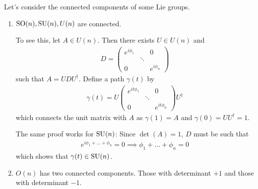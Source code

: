 Let's consider the connected components of some Lie groups.
\begin{enumerate}
  \item $\operatorname{SO}(n), \operatorname{SU}(n), U(n)$ are connected.

    To see this, let $A \in U(n)$. Then there exists $U \in U(n)$ and
    \begin{align*}
      D= \begin{pmatrix}
      e^{i \phi_1} &  & 0\\
       & \ddots & \\
      0 &  & e^{i \phi_n}
      \end{pmatrix}
    \end{align*}
    such that $A = UDU^{\dagger}$. Define a path $\gamma(t)$ by
    \begin{align*}
      \gamma(t) = U
      \begin{pmatrix}
      e^{it \phi_1} &  & 0\\
       & \ddots & \\
      0 &  & e^{i t\phi_n}
      \end{pmatrix}
      U^{\dagger}
    \end{align*}
    which connects the unit matrix with $A$ as $\gamma(1) = A$ and $\gamma(0) = UU^{\dagger} = 1$.

    The same proof works for $\operatorname{SU}(n)$: Since $\det(A) = 1$, $D$ must be such that
    \begin{align*}
      e^{i \phi_1 + \ldots + \phi_n} = 0 \implies \phi_1 + \ldots + \phi_n = 0
    \end{align*}
    which shows that $\gamma(t) \in \operatorname{SU}(n)$.
      
  \item $O(n)$ has two connected components. Those with determinant $+1$ and those with determinant $-1$.


\end{enumerate}
